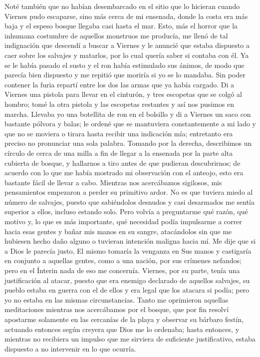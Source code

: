 \documentclass{novela}
\begin{document}
    Noté también que no habían desembarcado en el sitio que lo hicieran cuando Viernes pudo escaparse, sino más cerca de mi ensenada, donde la costa era más baja y el espeso bosque llegaba casi hasta el mar. Esto, más el horror que la inhumana costumbre de aquellos monstruos me producía, me llenó de tal indignación que descendí a buscar a Viernes y le anuncié que estaba dispuesto a caer sobre los salvajes y matarlos, por lo cual quería saber si contaba con él. Ya se le había pasado el susto y el ron había estimulado sus ánimos, de modo que parecía bien dispuesto y me repitió que moriría si yo se lo mandaba.
    Sin poder contener la furia repartí entre los dos las armas que ya había cargado. Di a Viernes una pistola para llevar en el cinturón, y tres escopetas que se colgó al hombro; tomé la otra pistola y las escopetas restantes y así nos pusimos en marcha. Llevaba yo una botellita de ron en el bolsillo y di a Viernes un saco con bastante pólvora y balas; le ordené que se mantuviera constantemente a mi lado y que no se moviera o tirara hasta recibir una indicación mía; entretanto era preciso no pronunciar una sola palabra. Tomando por la derecha, describimos un círculo de cerca de una milla a fin de llegar a la ensenada por la parte alta cubierta de bosque, y hallarnos a tiro antes de que pudieran descubrirnos; de acuerdo con lo que me había mostrado mi observación con el anteojo, esto era bastante fácil de llevar a cabo.
    Mientras nos acercábamos sigilosos, mis pensamientos empezaron a perder su primitivo ardor. No es que tuviera miedo al número de salvajes, puesto que sabiéndolos desnudos y casi desarmados me sentía superior a ellos, incluso estando solo. Pero volvía a preguntarme qué razón, qué motivo y, lo que es más importante, qué necesidad podía impulsarme a correr hacia esas gentes y bañar mis manos en su sangre, atacándolos sin que me hubiesen hecho daño alguno o tuvieran intención maligna hacia mí. Me dije que si a Dios le parecía justo, El mismo tomaría la venganza en Sus manos y castigaría en conjunto a aquellas gentes, como a una nación, por sus crímenes nefandos; pero en el Ínterin nada de eso me concernía. Viernes, por su parte, tenía una justificación al atacar, puesto que era enemigo declarado de aquellos salvajes, su pueblo estaba en guerra con el de ellos y era legal que los atacara si podía; pero yo no estaba en las mismas circunstancias.
    Tanto me oprimieron aquellas meditaciones mientras nos acercábamos por el bosque, que por fin resolví apostarme solamente en las cercanías de la playa y observar su bárbaro festín, actuando entonces según creyera que Dios me lo ordenaba; hasta entonces, y mientras no recibiera un impulso que me sirviera de suficiente justificativo, estaba dispuesto a no intervenir en lo que ocurría.
\end{document}
